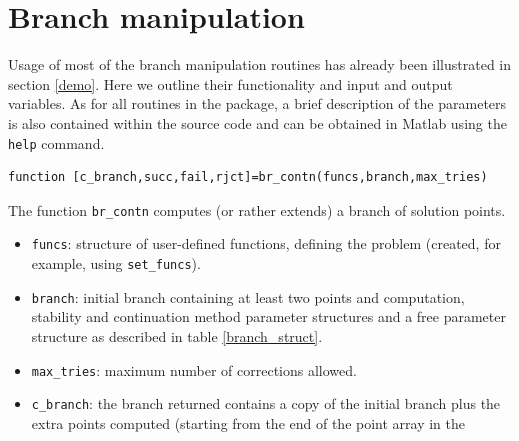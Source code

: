 \documentclass[10pt]{scrartcl}
\newcommand{\blist}[1]{\mbox{\lstinline!#1!}}
\begin{document}
{\section{Branch manipulation}\label{branch_manipulation}

Usage of most of
the branch manipulation routines has already been illustrated
in section \ref{demo}.
Here we outline their functionality and input and output variables.
As for all routines in the package, 
a brief description of the parameters is also contained
within the source code and can be obtained in Matlab using the
\blist{help} command.
\begin{lstlisting}
function [c_branch,succ,fail,rjct]=br_contn(funcs,branch,max_tries)  
\end{lstlisting}
\noindent The function \blist{br_contn} computes (or rather 
extends) a branch of solution
points. 
\begin{itemize}
\item \blist{funcs}: structure of user-defined functions, defining the
  problem (created, for example, using \blist{set_funcs}).
\item \blist{branch}: initial branch 
containing at least two points and computation, stability and 
continuation method parameter
structures and a free parameter structure as described in 
table \ref{branch_struct}. 
\item \blist{max_tries}:
maximum number of corrections allowed.
\item \blist{c_branch}:
the branch returned contains a copy of the initial branch plus
the extra points computed (starting from the end of the point array in the

\end{itemize}}
\end{document}
